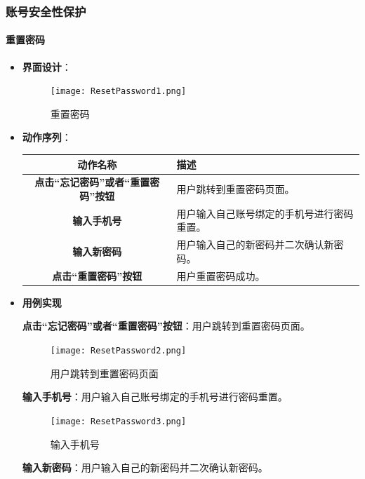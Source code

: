 \subsubsection{账号安全性保护}

\paragraph{重置密码}

\begin{itemize}
\item \textbf{界面设计}：
	\begin{figure}[H]
		\centering
		\texttt{[image: ResetPassword1.png]}
		\caption{重置密码}
	\end{figure}
	\item \textbf{动作序列}：
	\begin{table}[H]
		\centering
		\renewcommand\arraystretch{1.5}
		\begin{tabular}{|c|>{\raggedright\arraybackslash}p{10cm}|}
			\hline
			\textbf{动作名称} & \textbf{描述} \\ \hline
			\textbf{点击“忘记密码”或者“重置密码”按钮} & 用户跳转到重置密码页面。\\ \hline
			\textbf{输入手机号} & 用户输入自己账号绑定的手机号进行密码重置。\\ \hline
			\textbf{输入新密码} & 用户输入自己的新密码并二次确认新密码。\\ \hline
			\textbf{点击“重置密码”按钮} & 用户重置密码成功。\\ \hline
		\end{tabular}
	\end{table}

	\item \textbf{用例实现}

	\textbf{点击“忘记密码”或者“重置密码”按钮}：用户跳转到重置密码页面。

	\begin{figure}[H]
		\centering
		\texttt{[image: ResetPassword2.png]}
		\caption{用户跳转到重置密码页面}
	\end{figure}

	\textbf{输入手机号}：用户输入自己账号绑定的手机号进行密码重置。

	\begin{figure}[H]
		\centering
		\texttt{[image: ResetPassword3.png]}
		\caption{输入手机号}
	\end{figure}

	\textbf{输入新密码}：用户输入自己的新密码并二次确认新密码。


\end{itemize}
